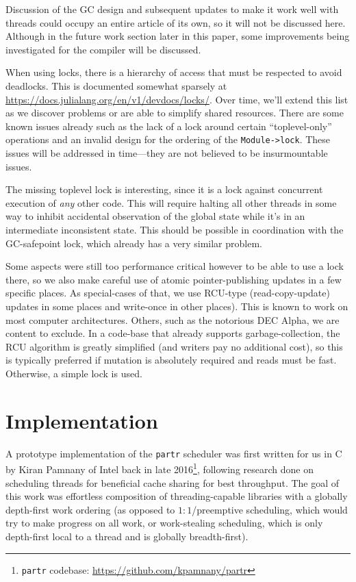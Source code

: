 \documentclass{juliacon}
\begin{document}
Discussion of the GC design and subsequent updates to make it work well with threads could occupy an entire article of its own, so it will not be discussed here. Although in the future work section later in this paper, some improvements being investigated for the compiler will be discussed.

When using locks, there is a hierarchy of access that must be respected to avoid deadlocks. This is documented somewhat sparsely at \url{https://docs.julialang.org/en/v1/devdocs/locks/}. Over time, we'll extend this list as we discover problems or are able to simplify shared resources. There are some known issues already such as the lack of a lock around certain ``toplevel-only'' operations and an invalid design for the ordering of the \verb|Module->lock|. These issues will be addressed in time—they are not believed to be insurmountable issues.

The missing toplevel lock is interesting, since it is a lock against concurrent execution of \textit{any} other code. This will require halting all other threads in some way to inhibit accidental observation of the global state while it's in an intermediate inconsistent state. This should be possible in coordination with the GC-safepoint lock, which already has a very similar problem.

Some aspects were still too performance critical however to be able to use a lock there, so we also make careful use of atomic pointer-publishing updates in a few specific places. As special-cases of that, we use RCU-type (read-copy-update) updates in some places and write-once in other places). This is known to work on most computer architectures. Others, such as the notorious DEC Alpha, we are content to exclude. In a code-base that already supports garbage-collection, the RCU algorithm is greatly simplified (and writers pay no additional cost), so this is typically preferred if mutation is absolutely required and reads must be fast. Otherwise, a simple lock is used.

\section{Implementation}
\label{subsub:implementation}

A prototype implementation of the \verb|partr| scheduler was first written for us in C by Kiran Pamnany of Intel back in late 2016\footnote{\verb|partr| codebase: \url{https://github.com/kpamnany/partr}}, following research done on scheduling threads for beneficial cache sharing for best throughput\cite{Chen:2007:STC:1248377.1248396}. The goal of this work was effortless composition of threading-capable libraries with a globally depth-first work ordering (as opposed to $1 \mathbin{:} 1$/preemptive scheduling, which would try to make progress on all work, or work-stealing scheduling, which is only depth-first local to a thread and is globally breadth-first).
\end{document}
